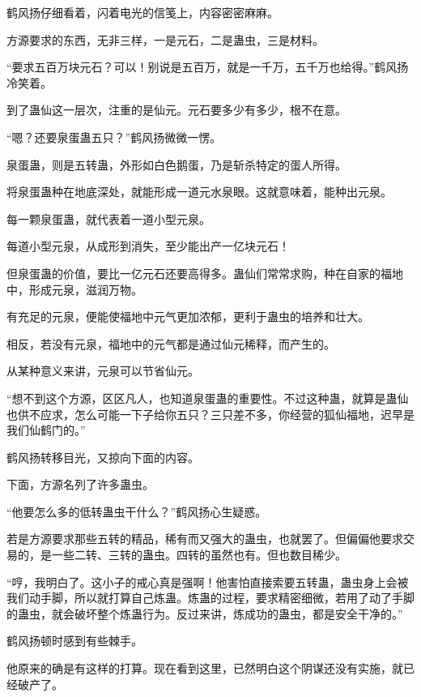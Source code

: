 
\begin{this_body}

鹤风扬仔细看着，闪着电光的信笺上，内容密密麻麻。

方源要求的东西，无非三样，一是元石，二是蛊虫，三是材料。

“要求五百万块元石？可以！别说是五百万，就是一千万，五千万也给得。”鹤风扬冷笑着。

到了蛊仙这一层次，注重的是仙元。元石要多少有多少，根不在意。

“嗯？还要泉蛋蛊五只？”鹤风扬微微一愣。

泉蛋蛊，则是五转蛊，外形如白色鹅蛋，乃是斩杀特定的蛋人所得。

将泉蛋蛊种在地底深处，就能形成一道元水泉眼。这就意味着，能种出元泉。

每一颗泉蛋蛊，就代表着一道小型元泉。

每道小型元泉，从成形到消失，至少能出产一亿块元石！

但泉蛋蛊的价值，要比一亿元石还要高得多。蛊仙们常常求购，种在自家的福地中，形成元泉，滋润万物。

有充足的元泉，便能使福地中元气更加浓郁，更利于蛊虫的培养和壮大。

相反，若没有元泉，福地中的元气都是通过仙元稀释，而产生的。

从某种意义来讲，元泉可以节省仙元。

“想不到这个方源，区区凡人，也知道泉蛋蛊的重要性。不过这种蛊，就算是蛊仙也供不应求，怎么可能一下子给你五只？三只差不多，你经营的狐仙福地，迟早是我们仙鹤门的。”

鹤风扬转移目光，又掠向下面的内容。

下面，方源名列了许多蛊虫。

“他要怎么多的低转蛊虫干什么？”鹤风扬心生疑惑。

若是方源要求那些五转的精品，稀有而又强大的蛊虫，也就罢了。但偏偏他要求交易的，是一些二转、三转的蛊虫。四转的虽然也有。但也数目稀少。

“哼，我明白了。这小子的戒心真是强啊！他害怕直接索要五转蛊，蛊虫身上会被我们动手脚，所以就打算自己炼蛊。炼蛊的过程，要求精密细微，若用了动了手脚的蛊虫，就会破坏整个炼蛊行为。反过来讲，炼成功的蛊虫，都是安全干净的。”

鹤风扬顿时感到有些棘手。

他原来的确是有这样的打算。现在看到这里，已然明白这个阴谋还没有实施，就已经破产了。


\end{this_body}
